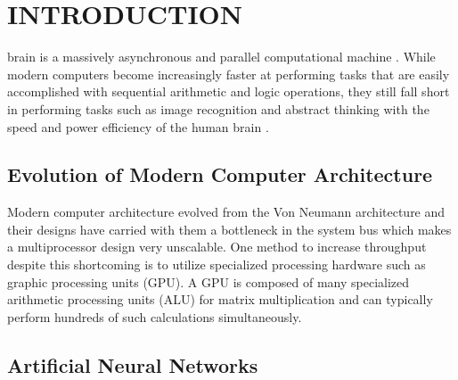 \documentclass[journal]{IEEEtran}
\begin{document}

\section{INTRODUCTION}
% 
% 
% 
% 

 brain is a massively asynchronous and parallel computational machine \cite{zeki2015massively,hawkins2004intelligence,shanahan2015technological}. While modern computers become increasingly faster at performing tasks that are easily accomplished with sequential arithmetic and logic operations, they still fall short in performing tasks such as image recognition and abstract thinking with the speed and power efficiency of the human brain \cite{hawkins2004intelligence,shanahan2015technological}. 

\subsection{Evolution of Modern Computer Architecture}

Modern computer architecture evolved from the Von Neumann architecture and their designs have carried with them a bottleneck in the system bus which makes a multiprocessor design very unscalable. One method to increase throughput despite this shortcoming is to utilize specialized processing hardware such as graphic processing units (GPU). A GPU is composed of many specialized arithmetic processing units (ALU) for matrix multiplication and can typically perform hundreds of such calculations simultaneously.

\subsection{Artificial Neural Networks}
\end{document}

